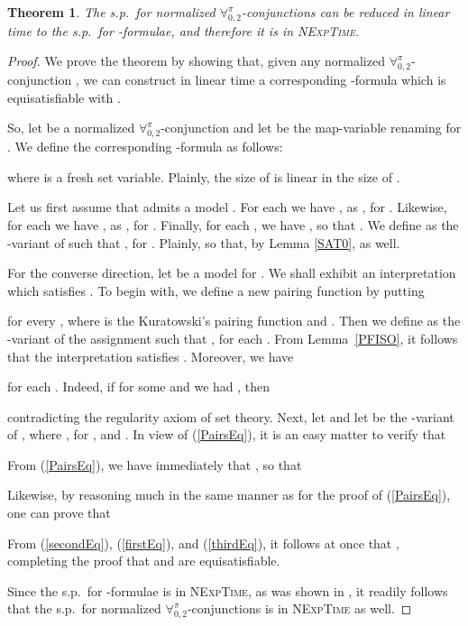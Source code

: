 \documentclass[submission,copyright,creativecommons]{eptcs}
\newtheorem{theorem}{Theorem}
\newcommand{\Lang}{\ensuremath{\mathbf{\forall}^{\pi}_{0,2}}\xspace}
\begin{document}
\begin{theorem}\label{DEC}
The s.p.\ for normalized \Lang-conjunctions can be reduced in linear
time to the s.p.\ for \Forallpizero-formulae, and therefore it is in
\textsc{NExpTime}.
\end{theorem}
\begin{proof}
We prove the theorem by showing that, given any normalized
\Lang-conjunction , we can construct in linear time a
corresponding \Forallpizero-formula  which is
equisatisfiable with .

So, let  be a normalized \Lang-conjunction and let  be the map-variable renaming for .
We define the corresponding \Forallpizero-formula  as
follows:

where  is a fresh set variable. Plainly, the size of  
is linear in the size of .

Let us first assume that  admits a model .  For each  we
have , as , for .  Likewise, for each 
we have , as
, for .  Finally, for each , we have , so that .
We define  as the -variant of 
such that , for .  Plainly,  so
that, by Lemma \ref{SAT0},  as well.

For the converse direction, let
 be a model for .  We shall
exhibit an interpretation  which satisfies .  To
begin with, we define a new pairing function  by putting

for every , where  is the
Kuratowski's pairing function and .  Then we define  as the
-variant of the assignment  such that
, for each
.  From Lemma~\ref{PFISO}, it follows that
the interpretation  satisfies
.  
Moreover, we have

for each .  
Indeed, if for some 
and  we had , then

contradicting the regularity axiom of set theory. 
Next, let  and let  be the -variant of , where
, for , and  .  In view of (\ref{PairsEq}), it is an easy
matter to verify that 

From (\ref{PairsEq}), we have immediately that
, so that

Likewise, by reasoning much in
the same manner as for the proof of (\ref{PairsEq}), one can prove
that

From (\ref{secondEq}), (\ref{firstEq}), and (\ref{thirdEq}), it 
follows at once that , completing the 
proof that  and  are equisatisfiable.

Since the s.p.\ for \Forallpizero-formulae is in \textsc{NExpTime}, 
as was shown in \cite[Section~3.1]{CanLonNic2011}, it readily follows 
that the s.p.\ for normalized \Lang-conjunctions is in 
\textsc{NExpTime} as well.
\end{proof}
\end{document}
